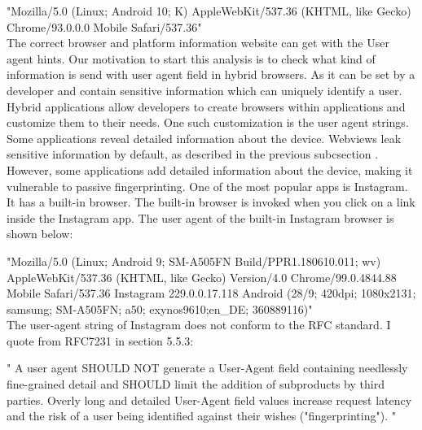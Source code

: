        "{Mozilla/5.0 (Linux; Android 10; K) AppleWebKit/537.36 (KHTML, like  Gecko) Chrome/93.0.0.0 Mobile Safari/537.36}" \\
       
The correct browser and platform information website can get with the User agent hints\cite{useragentred}.
Our motivation to start this analysis is to check what kind of information is send with user agent field in hybrid browsers. As it can be set by a developer and contain sensitive information which can uniquely identify a user. 
Hybrid applications allow developers to create browsers within applications and customize them to their needs. One such customization is the user agent strings. Some applications reveal detailed information about the device. Webviews leak sensitive information by default, as described in the previous subcsection . However, some applications add detailed information about the device, making it vulnerable to passive fingerprinting. One of the most popular apps is Instagram. It has a built-in browser. The built-in browser is invoked when you click on a link inside the Instagram app. The user agent of the built-in Instagram browser is shown below:\par

           {"Mozilla/5.0 (Linux; Android 9; SM-A505FN Build/PPR1.180610.011; wv) AppleWebKit/537.36 (KHTML, like Gecko) Version/4.0  Chrome/99.0.4844.88 Mobile Safari/537.36 Instagram 229.0.0.17.118  Android (28/9; 420dpi; 1080x2131;           samsung; SM-A505FN; a50; exynos9610;en\_DE; 360889116)"}
\\
The user-agent string of Instagram does not conform to the RFC standard. I quote from RFC7231 in section 5.5.3\cite{rfc}:

    {" A user agent SHOULD NOT generate a User-Agent field  containing needlessly fine-grained detail and SHOULD limit the addition of  subproducts by third parties.  Overly long and detailed User-Agent  field values increase request latency and the risk of a user being identified against their wishes ("fingerprinting"). "}

